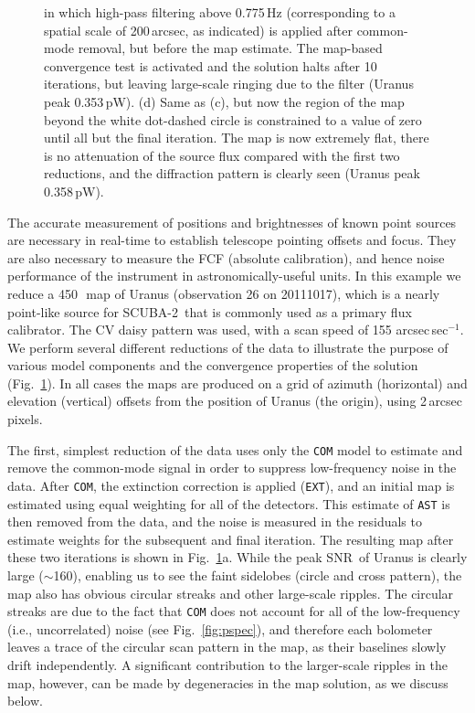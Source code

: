 \documentclass[useAMS,usenatbib,nofootinbib]{mn2e}
\newcommand{\snr}{SNR}
\newcommand{\scuba}{SCUBA-2}
\newcommand{\model}[1]{\texttt{#1}}
\begin{document}
\begin{figure}
{  in which high-pass filtering above 0.775\,Hz (corresponding to a
  spatial scale of 200\,arcsec, as indicated) is applied after
  common-mode removal, but before the map estimate. The map-based
  convergence test is activated and the solution halts after 10
  iterations, but leaving large-scale ringing due to the filter
  (Uranus peak 0.353\,pW). (d) Same as (c), but now the region of the
  map beyond the white dot-dashed circle is constrained to a value of
  zero until all but the final iteration.  The map is now extremely
  flat, there is no attenuation of the source flux compared with the
  first two reductions, and the diffraction pattern is clearly seen
  (Uranus peak 0.358\,pW).  }
\label{fig:pointmaps}
\end{figure}

The accurate measurement of positions and brightnesses of known point
sources are necessary in real-time to establish telescope pointing
offsets and focus. They are also necessary to measure the FCF
(absolute calibration), and hence noise performance of the instrument
in astronomically-useful units.  In this example we reduce a
450\,\micron\ map of Uranus (observation 26 on 20111017), which is a
nearly point-like source for \scuba\ that is commonly used as a
primary flux calibrator. The CV daisy pattern was used, with a scan
speed of 155 arcsec\,sec$^{-1}$. We perform several different
reductions of the data to illustrate the purpose of various model
components and the convergence properties of the solution
(Fig.~\ref{fig:pointmaps}). In all cases the maps are produced on a
grid of azimuth (horizontal) and elevation (vertical) offsets from the
position of Uranus (the origin), using 2\,arcsec pixels.

The first, simplest reduction of the data uses only the \model{COM}
model to estimate and remove the common-mode signal in order to
suppress low-frequency noise in the data. After \model{COM}, the
extinction correction is applied (\model{EXT}), and an initial map is
estimated using equal weighting for all of the detectors. This
estimate of \model{AST} is then removed from the data, and the noise
is measured in the residuals to estimate weights for the subsequent
and final iteration. The resulting map after these two iterations is
shown in Fig.~\ref{fig:pointmaps}a. While the peak \snr\ of Uranus is
clearly large ($\sim$160), enabling us to see the faint sidelobes
(circle and cross pattern), the map also has obvious circular streaks
and other large-scale ripples. The circular streaks are due to the
fact that \model{COM} does not account for all of the low-frequency
(i.e., uncorrelated) noise (see Fig.~\ref{fig:pspec}), and therefore
each bolometer leaves a trace of the circular scan pattern in the map,
as their baselines slowly drift independently. A significant
contribution to the larger-scale ripples in the map, however, can be
made by degeneracies in the map solution, as we discuss below.
\end{document}
